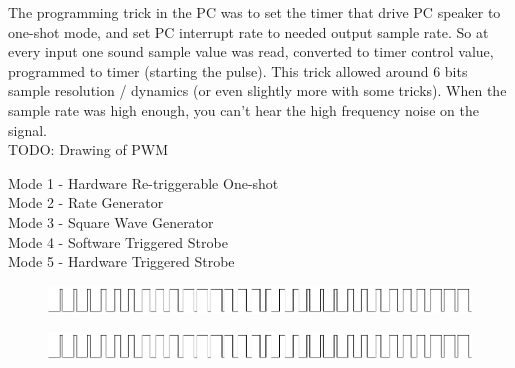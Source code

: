   \par
The programming trick in the PC was to set the timer that drive PC speaker to one-shot mode, and set PC interrupt rate to needed output sample rate. So at every input one sound sample value was read, converted to timer control value, programmed to timer (starting the pulse). This trick allowed around 6 bits sample resolution / dynamics (or even slightly more with some tricks). When the sample rate was high enough, you can’t hear the high frequency noise on the signal.\\
TODO: Drawing of PWM
\par
Mode 1 - Hardware Re-triggerable One-shot\\
Mode 2 - Rate Generator\\
Mode 3 - Square Wave Generator\\
Mode 4 - Software Triggered Strobe\\
Mode 5 - Hardware Triggered Strobe\\
\par
\begin{figure}[H]
\centering
 \includegraphics[width=\textwidth]{imgs/drawings/pwm/sinuois.png}
 \end{figure}
\par

\par
\begin{figure}[H]
\centering
 \includegraphics[width=\textwidth]{imgs/drawings/pwm/pwm_approximation.png}
 \end{figure}
\par


